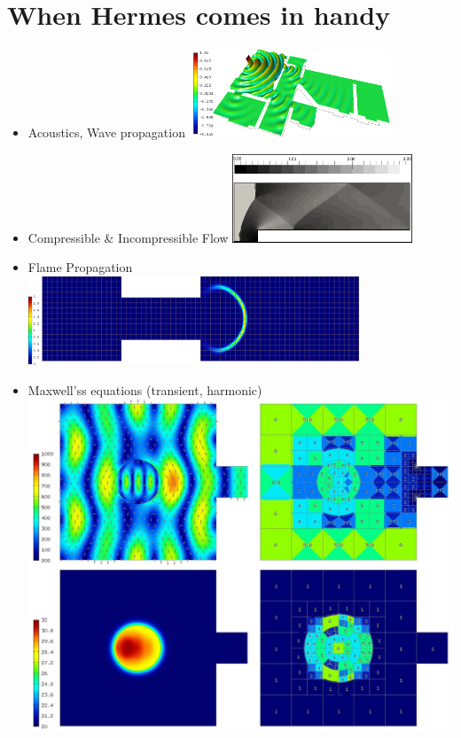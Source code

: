 \documentclass{beamer}
\begin{document}
\section{When Hermes comes in handy}
\begin{frame}
	\begin{itemize}
		\item \small  Acoustics, Wave propagation \hspace{15mm} \includegraphics[height=.06\textheight]{outputs/apartment-sol.png} 
		\item \small  Compressible \& Incompressible Flow \hspace{36mm}  \includegraphics[height=.06\textheight]{outputs/sln4.png} 
		\item \small  Flame Propagation \hspace{25mm}  \includegraphics[height=.06\textheight]{outputs/sol31.png} 
		\item \small  Maxwell'ss equations (transient, harmonic) \hspace{31mm}  \includegraphics[height=.06\textheight]{outputs/micro.jpg} 

\end{itemize}
\end{frame}
\end{document}
